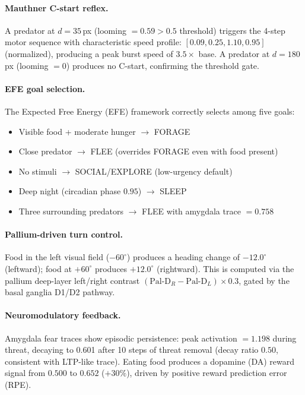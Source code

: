 \documentclass[11pt,a4paper]{article}
\begin{document}
\paragraph{Mauthner C-start reflex.}
A predator at $d = 35$\,px (looming $= 0.59 > 0.5$ threshold) triggers
the 4-step motor sequence with characteristic speed profile:
$[0.09, 0.25, 1.10, 0.95]$ (normalized), producing a peak burst speed
of $3.5\times$ base. A predator at $d = 180$\,px (looming $= 0$) produces
no C-start, confirming the threshold gate.

\paragraph{EFE goal selection.}
The Expected Free Energy (EFE) framework correctly selects among five goals:
\begin{itemize}[nosep]
  \item Visible food + moderate hunger $\to$ FORAGE
  \item Close predator $\to$ FLEE (overrides FORAGE even with food present)
  \item No stimuli $\to$ SOCIAL/EXPLORE (low-urgency default)
  \item Deep night (circadian phase $0.95$) $\to$ SLEEP
  \item Three surrounding predators $\to$ FLEE with amygdala trace $= 0.758$
\end{itemize}

\paragraph{Pallium-driven turn control.}
Food in the left visual field ($-60^\circ$) produces a heading change of
$-12.0^\circ$ (leftward); food at $+60^\circ$ produces $+12.0^\circ$ (rightward).
This is computed via the pallium deep-layer left/right contrast
$(\text{Pal-D}_R - \text{Pal-D}_L) \times 0.3$, gated by the basal ganglia
D1/D2 pathway.

\paragraph{Neuromodulatory feedback.}
Amygdala fear traces show episodic persistence: peak activation $= 1.198$
during threat, decaying to 0.601 after 10 steps of threat removal
(decay ratio $0.50$, consistent with LTP-like trace).
Eating food produces a dopamine (DA) reward signal from $0.500$ to $0.652$
($+30\%$), driven by positive reward prediction error (RPE).
\end{document}

